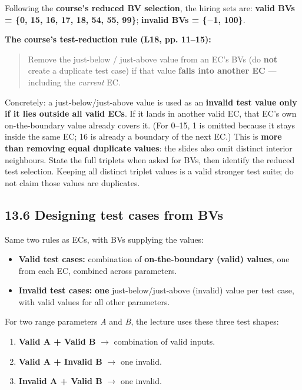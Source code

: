 \begin{studycolumns}
\vspace{0pt}

Following the \textbf{course's reduced BV selection}, the hiring sets are: \textbf{valid BVs = \{0, 15, 16, 17, 18, 54, 55, 99\}}; \textbf{invalid BVs = \{\ensuremath{-}1, 100\}}.

\textbf{The course's test-reduction rule (L18, pp. 11--15):}


\begin{quote}\small\color{navy}
Remove the just-below /\allowbreak{} just-above value from an EC's BVs (do \textbf{not} create a duplicate test case) if that value \textbf{falls into another EC} --- including the \emph{current} EC.

\end{quote}
Concretely: a just-below/\allowbreak{}just-above value is used as an \textbf{invalid test value only if it lies outside all valid ECs}. If it lands in another valid EC, that EC's own on-the-boundary value already covers it. (For 0--15, 1 is omitted because it stays inside the same EC; 16 is already a boundary of the next EC.) This is \textbf{more than removing equal duplicate values}: the slides also omit distinct interior neighbours. State the full triplets when asked for BVs, then identify the reduced test selection. Keeping all distinct triplet values is a valid stronger test suite; do not claim those values are duplicates.

\subsection*{13.6 Designing test cases from BVs}
Same two rules as ECs, with BVs supplying the values:

\begin{itemize}
\item \textbf{Valid test cases:} combination of \textbf{on-the-boundary (valid) values}, one from each EC, combined across parameters.
\item \textbf{Invalid test cases:} \textbf{one} just-below/\allowbreak{}just-above (invalid) value per test case, with valid values for all other parameters.
\end{itemize}
For two range parameters \emph{A} and \emph{B}, the lecture uses these three test shapes:

\begin{enumerate}
\item \textbf{Valid A + Valid B} \ensuremath{\rightarrow} combination of valid inputs.
\item \textbf{Valid A + Invalid B} \ensuremath{\rightarrow} one invalid.
\item \textbf{Invalid A + Valid B} \ensuremath{\rightarrow} one invalid.
\end{enumerate}

\end{studycolumns}
